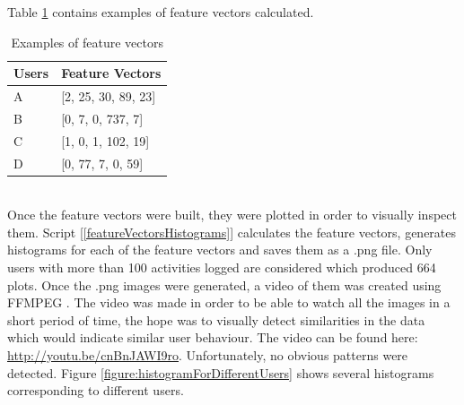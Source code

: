 \documentclass[11pt, oneside]{article}   	%
\begin{document}
Table \ref{table:featureVectorsInitial} contains examples of feature vectors calculated.
\begin{table}[h]
	\centering
	\begin{tabular}{| l | l |}
		\hline
		 \textbf{Users} & \textbf{Feature Vectors} \\ \hline
		 A & [2, 25, 30, 89, 23] \\ \hline
		 B & [0, 7, 0, 737, 7] \\ \hline
		 C & [1, 0, 1, 102, 19] \\ \hline
		 D & [0, 77, 7, 0, 59] \\ \hline
	\end{tabular}
	\caption{Examples of feature vectors}
	\label{table:featureVectorsInitial}
\end{table}
\\Once the feature vectors were built, they were plotted in order to visually inspect them. Script [\ref{featureVectorsHistograms}] calculates the feature vectors, generates histograms for each of the feature vectors and saves them as a .png file. Only users with more than 100 activities logged are considered which produced 664 plots. Once the .png images were generated, a video of them was created using FFMPEG \cite{ffmpeg}. The video was made in order to be able to watch all the images in a short period of time, the hope was to visually detect similarities in the data which would indicate similar user behaviour. The video can be found here: \url{http://youtu.be/cnBnJAWI9ro}. Unfortunately, no obvious patterns were detected. Figure \ref{figure:histogramForDifferentUsers} shows several histograms corresponding to different users.
\end{document}
